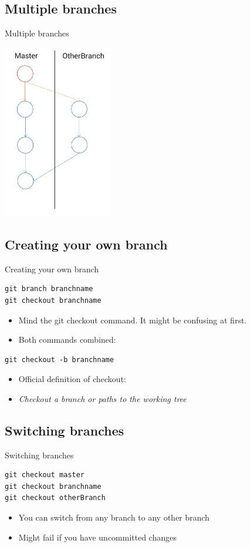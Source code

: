 \documentclass[10pt,a4paper]{beamer}
\begin{document}
\subsection{Multiple branches}
\begin{frame}{Multiple branches}
\centerline{\includegraphics[width=13em]{branch.png}}
\end{frame}

\subsection{Creating your own branch}
\begin{frame}[fragile]{Creating your own branch}
\begin{verbatim}
git branch branchname
git checkout branchname
\end{verbatim}
\begin{itemize}
\item Mind the git checkout command. It might be confusing at first.
\item Both commands combined:
\end{itemize}

\begin{verbatim}
git checkout -b branchname
\end{verbatim}
\begin{itemize}
\item Official definition of checkout:
\item \textit{Checkout a branch or paths to the working tree}
\end{itemize}
\end{frame}

\subsection{Switching branches}
\begin{frame}[fragile]{Switching branches}
\begin{verbatim}
git checkout master
git checkout branchname
git checkout otherBranch
\end{verbatim}
\begin{itemize}
\item You can switch from any branch to any other branch
\item Might fail if you have uncommitted changes
\end{itemize}
\end{frame}
\end{document}
